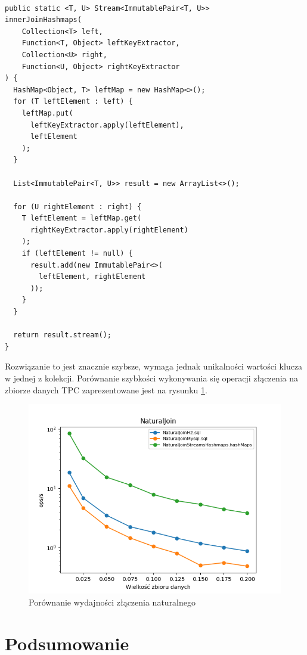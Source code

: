 \documentclass[12pt]{extarticle}
\begin{document}
\begin{lstlisting}[label=join3, caption=Rozwiązanie nr 3]

public static <T, U> Stream<ImmutablePair<T, U>> 
innerJoinHashmaps(
    Collection<T> left,
    Function<T, Object> leftKeyExtractor,
    Collection<U> right,
    Function<U, Object> rightKeyExtractor
) {
  HashMap<Object, T> leftMap = new HashMap<>();
  for (T leftElement : left) {
    leftMap.put(
      leftKeyExtractor.apply(leftElement),
      leftElement
    );
  }
  
  List<ImmutablePair<T, U>> result = new ArrayList<>();
  
  for (U rightElement : right) {
    T leftElement = leftMap.get(
      rightKeyExtractor.apply(rightElement)
    );
    if (leftElement != null) {
      result.add(new ImmutablePair<>(
        leftElement, rightElement
      ));
    }
  }
  
  return result.stream();
}
\end{lstlisting}

Rozwiązanie to jest znacznie szybsze, wymaga jednak unikalności wartości klucza w jednej z kolekcji. Porównanie szybkości wykonywania się operacji złączenia na zbiorze danych TPC zaprezentowane jest na rysunku \ref{fig:naturaljoin}.

\begin{figure}[H]
    \centering
    \includegraphics[width=13cm]{plots/NaturalJoin}
    \caption{Porównanie wydajności złączenia naturalnego}
    \label{fig:naturaljoin}
\end{figure}

\section{Podsumowanie}
\end{document}
